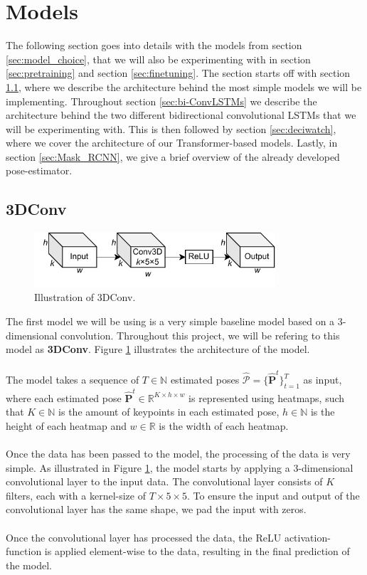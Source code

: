 \documentclass[./main.tex]{subfiles}
\begin{document}
\section{Models}
\label{sec:models}
The following section goes into details with the models from section \ref{sec:model_choice}, that we will also be experimenting with in section \ref{sec:pretraining} and section \ref{sec:finetuning}. The section starts off with section \ref{sec:3DConv}, where we describe the architecture behind the most simple models we will be implementing. Throughout section \ref{sec:bi-ConvLSTMs} we describe the architecture behind the two different bidirectional convolutional LSTMs that we will be experimenting with. This is then followed by section \ref{sec:deciwatch}, where we cover the architecture of our Transformer-based models. Lastly, in section \ref{sec:Mask_RCNN}, we give a brief overview of the already developed pose-estimator.

\subsection{3DConv}
\label{sec:3DConv}
\begin{figure}[htbp]
    \centering
    \includegraphics[width=0.8\textwidth]{./entities/baseline.pdf}
    \caption{Illustration of 3DConv.}
    \label{fig:baseline}
\end{figure}

\noindent The first model we will be using is a very simple baseline model based on a 3-dimensional convolution. Throughout this project, we will be refering to this model as \textbf{3DConv}. Figure \ref{fig:baseline} illustrates the architecture of the model.
\\
\\
The model takes a sequence of $T \in \mathbb{N}$ estimated poses $\hat{\mathcal{P}} = \{\hat{\bm{P}}^t\}_{t = 1} ^T$ as input, where each estimated pose $\hat{\bm{P}}^t \in \mathbb{R}^{K \times h \times w}$ is represented using heatmaps, such that $K \in \mathbb{N}$ is the amount of keypoints in each estimated pose, $h \in \mathbb{N}$ is the height of each heatmap and $w \in \mathbb{R}$ is the width of each heatmap.
\\
\\
Once the data has been passed to the model, the processing of the data is very simple. As illustrated in Figure \ref{fig:baseline}, the model starts by applying a 3-dimensional convolutional layer to the input data. The convolutional layer consists of $K$ filters, each with a kernel-size of $T \times 5 \times 5$. To ensure the input and output of the convolutional layer has the same shape, we pad the input with zeros.
\\
\\
Once the convolutional layer has processed the data, the ReLU activation-function is applied element-wise to the data, resulting in the final prediction of the model.
\end{document}
